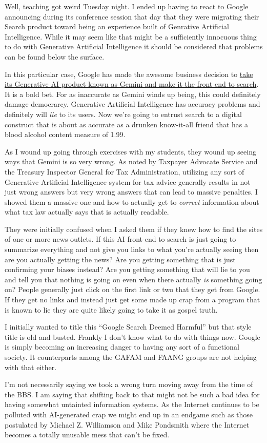 Well, teaching got weird Tuesday night. I ended up having to react to
Google announcing during its conference session that day that they were
migrating their Search product toward being an experience built of
Genrative Artificial Intelligence. While it may seem like that might be
a sufficiently innocuous thing to do with Generative Artificial
Intelligence it should be considered that problems can be found below
the surface.

In this particular case, Google has made the awesome business decision
to
\href{https://web.archive.org/web/20240515053544/https://blog.google/products/search/generative-ai-google-search-may-2024/}{take
its Generative AI product known as Gemini and make it the front end to
search}. It is a bold bet. For as inaccurate as Gemini winds up being,
this could definitely damage democrarcy. Generative Artificial
Intelligence has accuracy problems and definitely will \emph{lie} to its
users. Now we're going to entrust search to a digital construct that is
about as accurate as a drunken know-it-all friend that has a blood
alcohol content measure of 1.99.

As I wound up going through exercises with my students, they wound up
seeing ways that Gemini is so very wrong. As noted by Taxpayer Advocate
Service and the Treasury Inspector General for Tax Administration,
utilizing any sort of Generative Artificial Intelligence system for tax
advice generally results in not just wrong answers but very wrong
answers that can lead to massive penalties. I showed them a massive one
and how to actually get to \emph{correct} information about what tax law
actually says that is actually readable.

They were initially confused when I asked them if they knew how to find
the sites of one or more news outlets. If this AI front-end to search is
just going to summarize everything and not give you links to what you're
actually seeing then are you actually getting the news? Are you getting
something that is just confirming your biases instead? Are you getting
something that will lie to you and tell you that nothing is going on
even when there actually \emph{is} something going on? People generally
just click on the first link or two that they get from Google. If they
get no links and instead just get some made up crap from a program that
is known to lie they are quite likely going to take it as gospel truth.

I initially wanted to title this ``Google Search Deemed Harmful'' but
that style title is old and busted. Frankly I don't know what to do with
things now. Google is simply becoming an increasing danger to having any
sort of a functional society. It counterparts among the GAFAM and FAANG
groups are not helping with that either.

I'm not necessarily saying we took a wrong turn moving away from the
time of the BBS. I am saying that shifting back to that might not be
such a bad idea for having somewhat untainted information systems. As
the Internet continues to be polluted with AI-generated crap we might
end up in an endgame such as those postulated by Michael Z. Williamson
and Mike Pondsmith where the Internet becomes a totally unusable mess
that can't be fixed.

